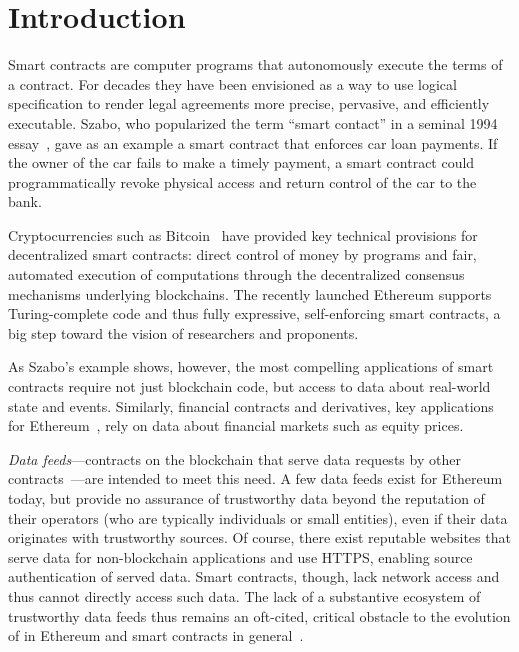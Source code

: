 \section{Introduction}

Smart contracts are computer programs that autonomously execute the terms of a contract.
For decades they have been envisioned as a way to use logical specification to render legal agreements more precise, pervasive, and efficiently executable.
Szabo, who popularized the term ``smart contact'' in a seminal 1994 essay~\cite{szabosmartcontract94}, gave as an example a smart contract that enforces car loan payments. If the owner of the car fails to make a timely payment, a smart contract could programmatically revoke physical access and return control of the car to the bank. %

Cryptocurrencies such as Bitcoin~\cite{bitcoin} have provided key technical provisions for decentralized smart contracts: direct control of money by programs and fair, automated execution of computations through the decentralized consensus mechanisms underlying  blockchains. 
The recently launched Ethereum supports Turing-complete code and thus fully expressive, self-enforcing smart contracts, a big step toward the vision of researchers and proponents.  

As Szabo's example shows, however, the most compelling applications of smart contracts require not just blockchain code, but access to data about real-world state and events. Similarly, financial contracts and derivatives, key applications for Ethereum~\cite{yellowpaper,whitepaper}, rely on data about financial markets such as equity prices. %

\emph{Data feeds}---contracts on the blockchain that serve data requests by other contracts~\cite{whitepaper,yellowpaper}---are intended to meet this need. A few data feeds exist for Ethereum today, but provide no assurance of trustworthy data beyond the reputation of their operators (who are typically individuals or small entities), even if their data originates with trustworthy sources. Of course, there exist reputable websites that serve data for non-blockchain applications and use HTTPS, enabling source authentication of served data. Smart contracts, though, lack network access and thus cannot directly access such data. The lack of a substantive ecosystem of trustworthy data feeds thus remains an oft-cited, critical obstacle to the evolution of in Ethereum and smart contracts 
in general~\cite{commblockstream}.

